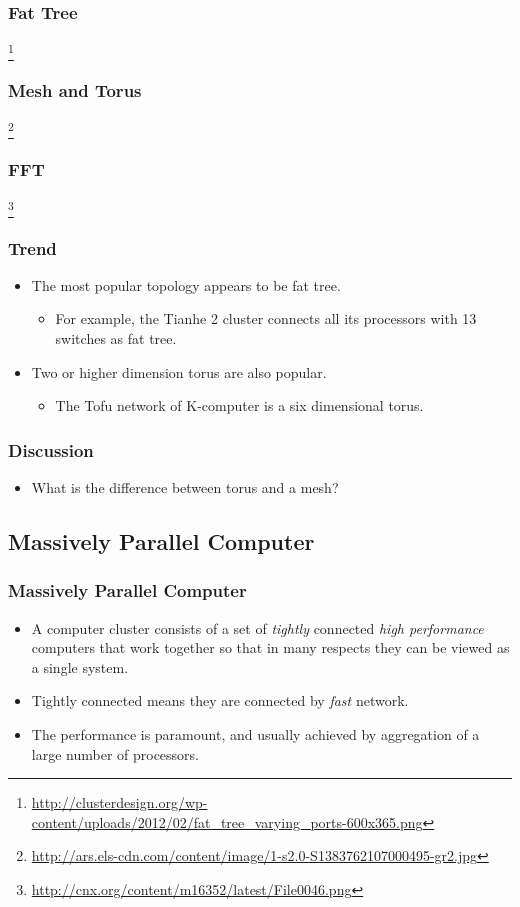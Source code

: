 \documentclass{beamer}
\begin{document}
\begin{CJK}{UTF8}{bsmi}
\begin{frame}
\frametitle{Fat Tree}
\centerline{}
\footnote{\url{http://clusterdesign.org/wp-content/uploads/2012/02/fat_tree_varying_ports-600x365.png}}
\end{frame}

\begin{frame}
\frametitle{Mesh and Torus}
\centerline{}
\footnote{\url{http://ars.els-cdn.com/content/image/1-s2.0-S1383762107000495-gr2.jpg}}
\end{frame}

\begin{frame}
\frametitle{FFT}
\centerline{}
\footnote{\url{http://cnx.org/content/m16352/latest/File0046.png}}
\end{frame}

\begin{frame}
\frametitle{Trend}
\begin{itemize}
\item The most popular topology appears to be fat tree.
\begin{itemize}
\item For example, the Tianhe 2 cluster connects all its processors
  with 13 switches as fat tree.
\end{itemize}
\item Two or higher dimension torus are also popular.
\begin{itemize}
\item The Tofu network of K-computer is a six dimensional torus.
\end{itemize}
\end{itemize}
\end{frame}

\begin{frame}
\frametitle{Discussion}
\begin{itemize}
\item What is the difference between torus and a mesh?
\end{itemize}
\end{frame}

\subsection{Massively Parallel Computer}

\begin{frame}
\frametitle{Massively Parallel Computer}
\begin{itemize}
\item A computer cluster consists of a set of {\em tightly} connected
  {\em high performance} computers that work together so that in many
  respects they can be viewed as a single system.
\item Tightly connected means they are connected by {\em fast}
  network.
\item The performance is paramount, and usually achieved by
  aggregation of a large number of processors.
\end{itemize}
\end{frame}


\end{CJK}
\end{document}
